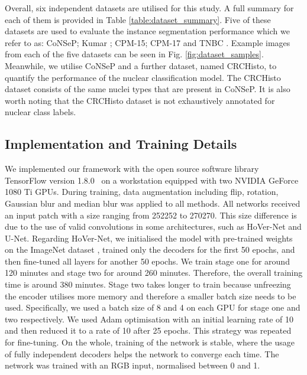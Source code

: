 \documentclass[journal]{IEEEtran}
\begin{document}
    Overall, six independent datasets are utilised for this study. A full summary for each of them is provided in Table \ref{table:dataset_summary}. Five of these datasets are used to evaluate the instance segmentation performance which we refer to as: CoNSeP; Kumar \cite{kumar}; CPM-15; CPM-17 \cite{vu2018methods} and TNBC \cite{naylor2018segmentation}. Example images from each of the five datasets can be seen in Fig. \ref{fig:dataset_samples}. Meanwhile, we utilise CoNSeP and a further dataset, named CRCHisto, to quantify the performance of the nuclear classification model. The CRCHisto dataset consists of the same nuclei types that are present in CoNSeP. It is also worth noting that the CRCHisto dataset is not exhaustively annotated for nuclear class labels. 

	\subsection{Implementation and Training Details} \label{section:implementation}
	We implemented our framework with the open source software library TensorFlow version 1.8.0~\cite{abadi2016tensorflow} on a workstation equipped with two NVIDIA GeForce 1080 Ti GPUs. During training, data augmentation including flip, rotation, Gaussian blur and median blur was applied to all methods. All networks received an input patch with a size ranging from 252252 to 270270. This size difference is due to the use of valid convolutions in some architectures, such as HoVer-Net and U-Net. Regarding HoVer-Net, we initialised the model with pre-trained weights on the ImageNet dataset \cite{imagenet_cvpr09}, trained only the decoders for the first 50 epochs, and then fine-tuned all layers for another 50 epochs. We train stage one for around 120 minutes and stage two for around 260 minutes. Therefore, the overall training time is around 380 minutes. Stage two takes longer to train because unfreezing the encoder utilises more memory and therefore a smaller batch size needs to be used. Specifically, we used a batch size of 8 and 4 on each GPU for stage one and two respectively. We used Adam optimisation with an initial learning rate of 10 and then reduced it to a rate of 10 after 25 epochs. This strategy was repeated for fine-tuning. On the whole, training of the network is stable, where the usage of fully independent decoders helps the network to converge each time. The network was trained with an RGB input, normalised between 0 and 1.
	
\end{document}
